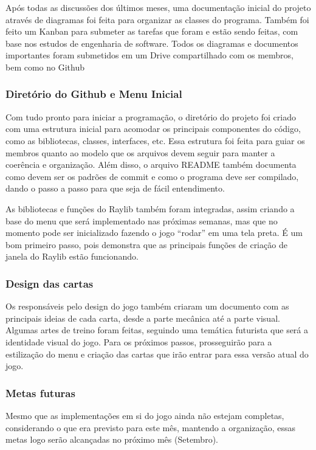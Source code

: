 Após todas as discussões dos últimos meses, uma documentação inicial do projeto através de diagramas foi feita para organizar as classes do programa. Também foi feito um Kanban para submeter as tarefas que foram e estão sendo feitas, com base nos estudos de engenharia de software. Todos os diagramas e documentos importantes foram submetidos em um Drive compartilhado com os membros, bem como no Github

\subsubsection{Diretório do Github e Menu Inicial}

Com tudo pronto para iniciar a programação, o diretório do projeto foi criado com uma estrutura inicial para acomodar os principais componentes do código, como as bibliotecas, classes, interfaces, etc. Essa estrutura foi feita para guiar os membros quanto ao modelo que os arquivos devem seguir para manter a coerência e organização. Além disso, o arquivo README também documenta como devem ser os padrões de commit e como o programa deve ser compilado, dando o passo a passo para que seja de fácil entendimento.

As bibliotecas e funções do Raylib também foram integradas, assim criando a base do menu que será implementado nas próximas semanas, mas que no momento pode ser inicializado fazendo o jogo “rodar” em uma tela preta. É um bom primeiro passo, pois demonstra que as principais funções de criação de janela do Raylib estão funcionando. 


\subsubsection{Design das cartas}

Os responsáveis pelo design do jogo também criaram um documento com as principais ideias de cada carta, desde a parte mecânica até a parte visual. Algumas artes de treino foram feitas, seguindo uma temática futurista que será a identidade visual do jogo. Para os próximos passos, prosseguirão para a estilização do menu e criação das cartas que irão entrar para essa versão atual do jogo.

\subsubsection{Metas futuras}

Mesmo que as implementações em si do jogo ainda não estejam completas, considerando o que era previsto para este mês, mantendo a organização, essas metas logo serão alcançadas no próximo mês (Setembro). 